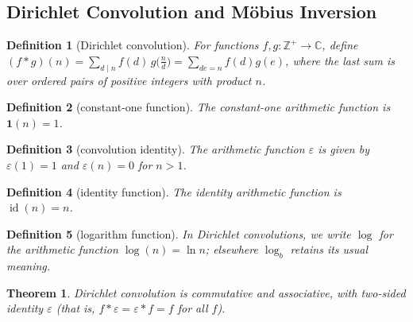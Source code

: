\documentclass[11pt]{article}
\theoremstyle{ntstyle}
\newtheorem{theorem}{Theorem}[subsection]
\newtheorem{definition}{Definition}[subsection]
\DeclareMathOperator{\id}{id}
\begin{document}
\subsection{Dirichlet Convolution and M{\"o}bius Inversion}

\begin{definition}[Dirichlet convolution]\label{def:5.3.1} For
	functions $f,g:\mathbb{Z}^+\to\mathbb{C}$, define
	$(f*g)(n) = \sum_{d \mid n} f(d)\, g\big(\tfrac{n}{d}\big) = \sum_{de =
			n} f(d) g(e)$, where the last sum is over ordered pairs of positive
	integers with product $n$.

\end{definition}
\begin{definition}[constant-one function]\label{def:5.3.2}
	The constant-one arithmetic function is $\mathbf{1}(n)=1$.

\end{definition}
\begin{definition}[convolution identity]\label{def:5.3.3}
	The arithmetic function $\varepsilon$ is given by
	$\varepsilon(1)=1$ and $\varepsilon(n)=0$ for $n>1$.

\end{definition}
\begin{definition}[identity function]\label{def:5.3.4}
	The identity arithmetic function is $\id(n)=n$.

\end{definition}
\begin{definition}[logarithm function]\label{def:5.3.5}
	In Dirichlet convolutions, we write $\log$ for the arithmetic function
	$\log(n)=\ln n$; elsewhere $\log_b$ retains its usual meaning.

\end{definition}
\begin{theorem}\label{thm:5.3.1}
	Dirichlet convolution is commutative and associative, with two-sided
	identity $\varepsilon$ (that is, $f*\varepsilon=\varepsilon*f=f$ for
	all $f$).

\end{theorem}
\end{document}
